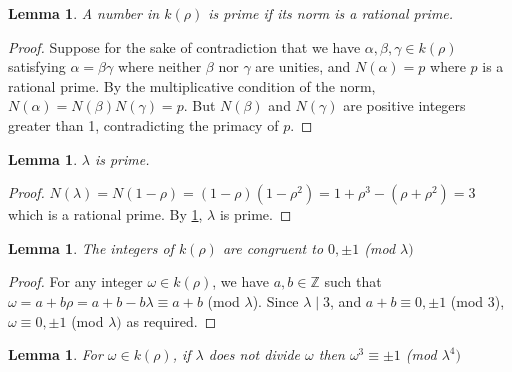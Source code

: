 \documentclass{article}
\newtheorem{lemma}[theorem]{Lemma}
\theoremstyle{definition}
\theoremstyle{definition}
\theoremstyle{definition}
\begin{document}
\begin{lemma} \label{Norm Prime}
    A number in $k(\rho)$ is prime if its norm is a rational prime.
\end{lemma}

\begin{proof}
    Suppose for the sake of contradiction that we have $\alpha,\beta, \gamma \in k(\rho)$ satisfying $\alpha=\beta\gamma$ where neither $\beta$ nor $\gamma$ are unities, and $N(\alpha)=p$ where $p$ is a rational prime. By the multiplicative condition of the norm, $N(\alpha)=N(\beta)N(\gamma)=p$. But $N(\beta)$ and $N(\gamma)$ are positive integers greater than 1, contradicting the primacy of $p$. 
\end{proof}

\begin{lemma}
    $\lambda$ is prime. 
\end{lemma}

\begin{proof}
    $N(\lambda)=N(1-\rho)=(1-\rho)(1-\rho^2)= 1+\rho^3-(\rho+\rho^2)=3$ which is a rational prime. By \ref{Norm Prime}, $\lambda$ is prime.
\end{proof}

\begin{lemma}\label{rho congruent}
    The integers of $k(\rho)$ are congruent to $0, \pm1$ (mod $\lambda)$
\end{lemma}

\begin{proof}
    For any integer $\omega \in k(\rho)$, we have $a,b\in \mathbb{Z}$ such that $\omega=a+b\rho=a+b-b\lambda\equiv a+b$ (mod $\lambda$). Since $\lambda\mid3$, and $a+b \equiv0,\pm1$ (mod $3$), $\omega\equiv0, \pm1$ (mod $\lambda)$ as required.
\end{proof}
\begin{lemma}\label{omega divide}
    For  $\omega\in k(\rho)$, if $\lambda$ does not divide $\omega$ then $\omega^3\equiv\pm1$ (mod $\lambda^4)$
\end{lemma}
\end{document}
